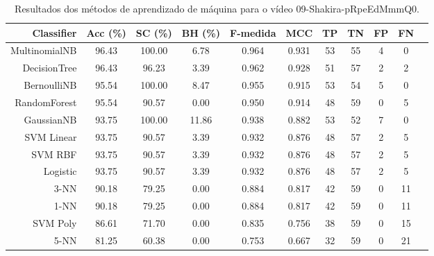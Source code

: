 \begin{table}[!htb]
\centering
\caption{Resultados dos métodos de aprendizado de máquina para o vídeo 09-Shakira-pRpeEdMmmQ0.}
\label{tab:09-Shakira-pRpeEdMmmQ0}
\begin{tabular}{r|c|c|c|c|c|c|c|c|c|c}
\hline\hline
Classifier & Acc (\%) & SC (\%) & BH (\%) & F-medida & MCC & TP & TN & FP & FN \\ \hline
MultinomialNB & 96.43 & 100.00 & 6.78 & 0.964 & 0.931 & 53 & 55 & 4 & 0 \\ 
DecisionTree & 96.43 & 96.23 & 3.39 & 0.962 & 0.928 & 51 & 57 & 2 & 2 \\ 
BernoulliNB & 95.54 & 100.00 & 8.47 & 0.955 & 0.915 & 53 & 54 & 5 & 0 \\ 
RandomForest & 95.54 & 90.57 & 0.00 & 0.950 & 0.914 & 48 & 59 & 0 & 5 \\ 
GaussianNB & 93.75 & 100.00 & 11.86 & 0.938 & 0.882 & 53 & 52 & 7 & 0 \\ 
SVM Linear & 93.75 & 90.57 & 3.39 & 0.932 & 0.876 & 48 & 57 & 2 & 5 \\ 
SVM RBF & 93.75 & 90.57 & 3.39 & 0.932 & 0.876 & 48 & 57 & 2 & 5 \\ 
Logistic & 93.75 & 90.57 & 3.39 & 0.932 & 0.876 & 48 & 57 & 2 & 5 \\ 
3-NN & 90.18 & 79.25 & 0.00 & 0.884 & 0.817 & 42 & 59 & 0 & 11 \\ 
1-NN & 90.18 & 79.25 & 0.00 & 0.884 & 0.817 & 42 & 59 & 0 & 11 \\ 
SVM Poly & 86.61 & 71.70 & 0.00 & 0.835 & 0.756 & 38 & 59 & 0 & 15 \\ 
5-NN & 81.25 & 60.38 & 0.00 & 0.753 & 0.667 & 32 & 59 & 0 & 21 \\ 
\hline\hline
\end{tabular}
\end{table}
